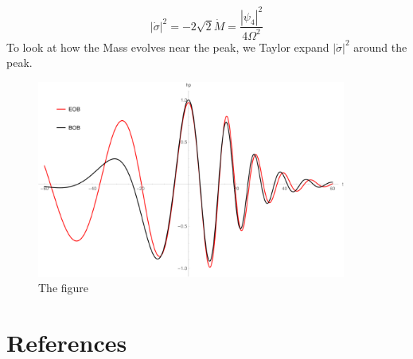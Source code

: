\documentclass[prd,preprintnumbers,onecolumn,eqsecnum,floatfix,letter]{revtex4}
\begin{document}
\begin{equation}
	|\dot{\sigma}|^2 = -2\sqrt{2}\dot{M} = \frac{|\psi_4|^2}{4\Omega^2}
\end{equation}
To look at how the Mass evolves near the peak, we Taylor expand $|\dot{\sigma}|^2$ around the peak.
\begin{figure}
	\includegraphics[width=4.0in]{../plots/SigmaSqr.pdf}
	\caption{The figure}
	\label{fig:SigmaSqr}
\end{figure} 

\section*{References}



\end{document}

